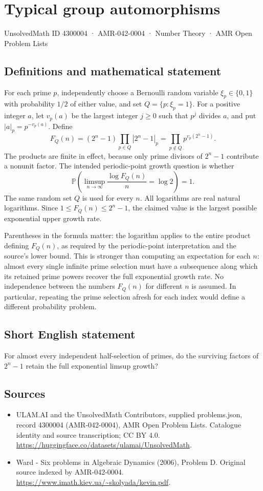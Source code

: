 \documentclass[11pt,a4paper]{article}
\begin{document}
\section*{Typical group automorphisms}\label{4300004}
{\small UnsolvedMath ID 4300004 · AMR-042-0004 · Number Theory · AMR Open Problem Lists}
\subsection{Definitions and mathematical statement}
For each prime $p$, independently choose a Bernoulli random variable
$\xi_p\in\{0,1\}$ with probability $1/2$ of either value, and set
$Q=\{p:\xi_p=1\}$. For a positive integer $a$, let $v_p(a)$ be the
largest integer $j\ge0$ such that $p^j$ divides $a$, and put
$|a|_p=p^{-v_p(a)}$. Define
\[
 F_Q(n)=(2^n-1)\prod_{p\in Q}|2^n-1|_p
       =\prod_{p\notin Q}p^{v_p(2^n-1)}.
\]
The products are finite in effect, because only prime divisors of
$2^n-1$ contribute a nonunit factor. The intended periodic-point growth
question is whether
\[
 \mathbb P\!\left(\limsup_{n\to\infty}\frac{\log F_Q(n)}{n}
                      =\log2\right)=1.
\]
The same random set $Q$ is used for every $n$. All logarithms are real
natural logarithms. Since $1\le F_Q(n)\le2^n-1$, the claimed value is the
largest possible exponential upper growth rate.

Parentheses in the formula matter: the logarithm applies to the entire
product defining $F_Q(n)$, as required by the periodic-point interpretation
and the source's lower bound. This is stronger than computing an
expectation for each $n$: almost every single infinite prime selection
must have a subsequence along which its retained prime powers recover
the full exponential growth rate. No independence between the numbers
$F_Q(n)$ for different $n$ is assumed. In particular, repeating the prime
selection afresh for each index would define a different probability problem.
\subsection{Short English statement}
For almost every independent half-selection of primes, do the surviving factors of $2^n-1$ retain the full exponential limsup growth?
\subsection{Sources}
\begin{itemize}
\item[S1] ULAM.AI and the UnsolvedMath Contributors, supplied problems.json, record 4300004 (AMR-042-0004), AMR Open Problem Lists. Catalogue identity and source transcription; CC BY 4.0.
\url{https://huggingface.co/datasets/ulamai/UnsolvedMath}.
\item[S2] Ward - Six problems in Algebraic Dynamics (2006), Problem D. Original source indexed by AMR-042-0004.
\url{https://www.imath.kiev.ua/~skolyada/kevin.pdf}.
\end{itemize}
\end{document}
